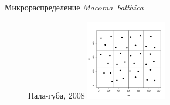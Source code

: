 \documentclass{beamer}
\begin{document}
\begin{frame}{Микрораспределение {\it Macoma~balthica}}
\begin{figure}
\begin{minipage}[b]{.49\linewidth}
	\end{minipage}
\hfil %
	\begin{minipage}[b]{.49\linewidth}
	\begin{center}
\tiny{Пала-губа, 2008}
\includegraphics[width=35mm]{./microdistribution/Pala_samples.pdf}
	\end{center}
	\end{minipage}
\end{figure}
\end{frame}
\end{document}
